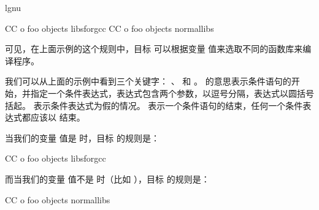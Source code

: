 \documentclass[a4paper,10pt]{sphinxmanual}
\begin{document}
\begin{sphinxVerbatim}[commandchars=\\\{\}]
  \PYGZhy{}lgnu
 

 
    CC \PYGZhy{}o foo objects libs\PYGZus{}for\PYGZus{}gcc
    CC \PYGZhy{}o foo objects normal\PYGZus{}libs
\end{sphinxVerbatim}

可见，在上面示例的这个规则中，目标  可以根据变量  值来选取不同的函数库来编译程序。

我们可以从上面的示例中看到三个关键字：  、  和  。  的意思表示条件语句的开始，并指定一个条件表达式，表达式包含两个参数，以逗号分隔，表达式以圆括号括起。  表示条件表达式为假的情况。  表示一个条件语句的结束，任何一个条件表达式都应该以  结束。

当我们的变量  值是  时，目标  的规则是：

\begin{sphinxVerbatim}[commandchars=\\\{\}]
 
    CC \PYGZhy{}o foo objects libs\PYGZus{}for\PYGZus{}gcc
\end{sphinxVerbatim}

而当我们的变量  值不是  时（比如  ），目标  的规则是：

\begin{sphinxVerbatim}[commandchars=\\\{\}]
 
    CC \PYGZhy{}o foo objects normal\PYGZus{}libs
\end{sphinxVerbatim}
\end{document}
